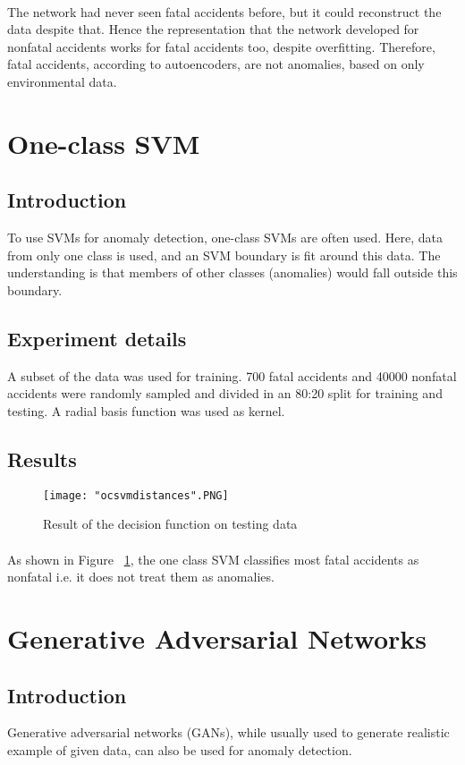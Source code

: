 \documentclass[a4paper, 12pt]{article}
\begin{document}
\paragraph{} The network had never seen fatal accidents before, but it could reconstruct the data despite that. Hence the representation that the network developed for nonfatal accidents works for fatal accidents too, despite overfitting. Therefore, fatal accidents, according to autoencoders, are not anomalies, based on only environmental data.
\section{One-class SVM}
\subsection{Introduction} 
To use SVMs for anomaly detection, one-class SVMs are often used. Here, data from only one class is used, and an SVM boundary is fit around this data. The understanding is that members of other classes (anomalies) would fall outside this boundary.
\subsection{Experiment details} A subset of the data was used for training. 700 fatal accidents and 40000 nonfatal accidents were randomly sampled and divided in an 80:20 split for training and testing. A radial basis function was used as kernel.
\subsection{Results}
\begin{figure}[h]
\centering
\texttt{[image: "ocsvmdistances".PNG]}
\caption{Result of the decision function on testing data}
\label{fig:ocsvm}
\end{figure}
\paragraph{} As shown in Figure ~\ref{fig:ocsvm}, the one class SVM classifies most fatal accidents as nonfatal i.e. it does not treat them as anomalies.
\section{Generative Adversarial Networks}
\subsection{Introduction}
Generative adversarial networks (GANs), while usually used to generate realistic example of given data, can also be used for anomaly detection.
\end{document}
